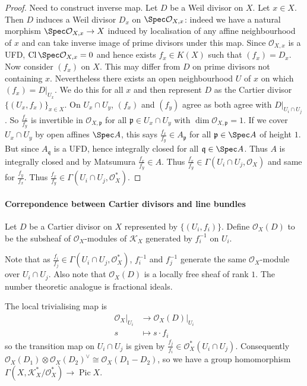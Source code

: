 \documentclass[a4paper]{article}
\newcommand{\sh}[1]{\mathcal{#1}} %
\DeclareMathOperator{\Pic}{Pic} %
\DeclareMathOperator{\Cl}{Cl} %
\begin{document}
\begin{proof}
  Need to construct inverse map. Let \(D\) be a Weil divisor on \(X\). Let \(x \in X\). Then \(D\) induces a Weil divisor \(D_x\) on \(\Spec \sh O_{X, x}\): indeed we have a natural morphism \(\Spec \sh O_{X, x} \to X\) induced by localisation of any affine neighbourhood of \(x\) and can take inverse image of prime divisors under this map. Since \(\sh O_{X, x}\) is a UFD, \(\Cl \Spec \sh O_{X, x} = 0\) and hence exists \(f_x \in K(X)\) such that \((f_x) = D_x\). Now consider \((f_x)\) on \(X\). This may differ from \(D\) on prime divisors not containing \(x\). Nevertheless there exists an open neighbourhood \(U\) of \(x\) on which \((f_x) = D|_{U_x}\). We do this for all \(x\) and then represent \(D\) as the Cartier divisor \(\{(U_x, f_x)\}_{x \in X}\). On \(U_x \cap U_y\), \((f_x)\) and \((f_y)\) agree as both agree with \(D|_{U_i \cap U_j}\). So \(\frac{f_x}{f_y}\) is invertible in \(\sh O_{X, \mathfrak p}\) for all \(\mathfrak p \in U_x \cap U_y\) with \(\dim \sh O_{X, \mathfrak p} = 1\). If we cover \(U_x \cap U_y\) by open affines \(\Spec A\), this says \(\frac{f_x}{f_y} \in A_{\mathfrak p}\) for all \(\mathfrak p \in \Spec A\) of height \(1\). But since \(A_{\mathfrak q}\) is a UFD, hence integrally closed for all \(\mathfrak q \in \Spec A\). Thus \(A\) is integrally closed and by Matsumura \(\frac{f_x}{f_y} \in A\). Thus \(\frac{f_x}{f_y} \in \Gamma(U_i \cap U_j, \sh O_X)\) and same for \(\frac{f_y}{f_x}\). Thus \(\frac{f_x}{f_y} \in \Gamma(U_i \cap U_j, \sh O_X^*)\).
\end{proof}

\paragraph{Correpondence between Cartier divisors and line bundles}

\begin{definition}
  Let \(D\) be a Cartier divisor on \(X\) represented by \(\{(U_i, f_i)\}\). Define \(\sh O_X(D)\) to be the subsheaf of \(\sh O_X\)-modules of \(\sh K_X\) generated by \(f_i^{-1}\) on \(U_i\).
\end{definition}

Note that as \(\frac{f_i}{f_j} \in \Gamma(U_i \cap U_j, \sh O_X^*)\), \(f_i^{-1}\) and \(f_j^{-1}\) generate the same \(\sh O_X\)-module over \(U_i \cap U_j\). Also note that \(\sh O_X(D)\) is a locally free sheaf of rank \(1\). The number theoretic analogue is fractional ideals.

\begin{remark}
  The local trivialising map is
  \begin{align*}
    \sh O_X|_{U_i} &\to \sh O_X(D)|_{U_i} \\
    s &\mapsto s \cdot f_i
  \end{align*}
  so the transition map on \(U_i \cap U_j\) is given by \(\frac{f_j}{f_i} \in \sh O_X^*(U_i \cap U_j)\). Consequently \(\sh O_X(D_1) \otimes \sh O_X(D_2)^\vee \cong \sh O_X(D_1 - D_2)\), so we have a group homomorphism \(\Gamma(X, \sh K_X^*/\sh O_X^*) \to \Pic X\).
\end{remark}
\end{document}
